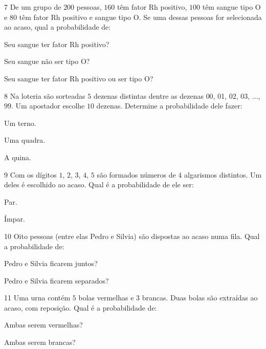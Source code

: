 {{{{\begin{escolha}
{\num{7}  De um grupo de $200$ pessoas, $160$ têm fator Rh positivo, $100$ têm sangue
tipo O e $80$ têm fator Rh positivo e sangue tipo O. Se uma dessas pessoas
for selecionada ao acaso, qual a probabilidade de:

\begin{escolha}
\item Seu sangue ter fator Rh positivo? 
\item Seu sangue não ser tipo O? 
\item Seu sangue ter fator Rh positivo ou ser tipo O? 
\end{escolha}

\num{8}  Na loteria são sorteadas $5$ dezenas distintas dentre as dezenas $00$,
01, $02$, $03$, ..., $99$. Um apostador escolhe $10$ dezenas. Determine a
probabilidade dele fazer:

\begin{escolha}
\item Um terno. 
\item Uma quadra. 
\item A quina. 
\end{escolha}

\num{9}  Com os dígitos $1$, $2$, $3$, $4$, $5$ são formados números de $4$ algarismos
distintos. Um deles é escolhido ao acaso. Qual é a probabilidade de ele
ser:

\begin{escolha}
\item Par. 
\item Ímpar. 
\end{escolha}

\num{10} Oito pessoas (entre elas Pedro e Silvia) são dispostas ao acaso numa
fila. Qual a probabilidade de:

\begin{escolha}
\item Pedro e Silvia ficarem juntos? 
\item Pedro e Silvia ficarem separados? 
\end{escolha}

\num{11} Uma urna contém $5$ bolas vermelhas e $3$ brancas. Duas bolas são
extraídas ao acaso, com reposição. Qual é a probabilidade de:

\begin{escolha}
\item Ambas serem vermelhas? 
\item Ambas serem brancas? 
\end{escolha}

}
\end{escolha}}}}}
